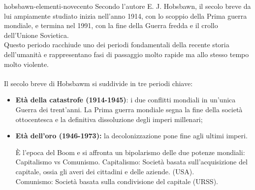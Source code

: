 \documentclass[preview]{standalone}
\begin{document}
\begin{snippet}{hobsbawn-elementi-novecento}
    Secondo l'autore E. J. Hobsbawn, il secolo breve da lui ampiamente studiato inizia nell'anno
    1914, con lo scoppio della Prima guerra mondiale, e termina nel 1991, con la fine della
    Guerra fredda e il crollo dell'Unione Sovietica.\\
    Questo periodo racchiude uno dei periodi fondamentali della recente storia dell'umanità e 
    rappresentano fasi di passaggio molto rapide ma allo stesso tempo molto violente.
    \\\\
    Il secolo breve di Hobsbawm si suddivide in tre periodi chiave:
    \begin{itemize}
        \item \textbf{Età della catastrofe (1914-1945)}: i due conflitti mondiali in un'unica Guerra dei trent'anni.
            La Prima guerra mondiale segna la fine della società ottocentesca e la definitiva
            dissoluzione degli imperi millenari;
        \item \textbf{Età dell'oro (1946-1973):} la decolonizzazione pone fine agli ultimi imperi.
    
            È l'epoca del Boom e si affronta un bipolarismo delle due potenze mondiali: Capitalismo vs Comunismo.
            {\footnotesize Capitalismo: Società basata sull'acquisizione del capitale, ossia gli
            averi dei cittadini e delle aziende. (USA).}\\
            {\footnotesize Comunismo: Società basata sulla condivisione del capitale (URSS).}
    

\end{itemize}
\end{snippet}
\end{document}
